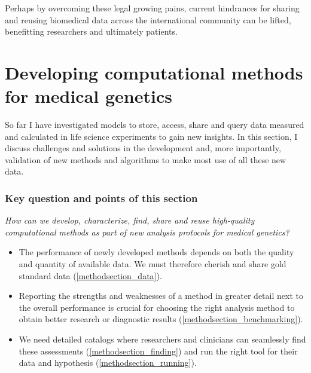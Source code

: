 Perhaps by overcoming these legal growing pains, current hindrances for sharing and reusing biomedical data across the international community can be lifted, benefitting researchers and ultimately patients.


\section{Developing computational methods for medical genetics} \label{methodsection}

So far I have investigated models to store, access, share and query data measured and calculated in life science experiments to gain new insights.
In this section, I discuss challenges and solutions in the development and, more importantly, validation of new methods and algorithms to make most use of all these new data.

\subsubsection*{Key question and points of this section}

\textsl{How can we develop, characterize, find, share and reuse high-quality computational methods as part of new analysis protocols for medical genetics?}

\begin{tcolorbox}[width=\textwidth,colframe=deeporange,colback={white},title={Key points},colbacktitle=deeporange,coltitle=black,enhanced]
  \begin{itemize}
    \item The performance of newly developed methods depends on both the quality and quantity of available data. We must therefore cherish and share gold standard data (\ref{methodsection_data}).
    \item Reporting the strengths and weaknesses of a method in greater detail next to the overall performance is crucial for choosing the right analysis method to obtain better research or diagnostic results (\ref{methodsection_benchmarking}).
    \item We need detailed catalogs where researchers and clinicians can seamlessly find these assessments (\ref{methodsection_finding}) and run the right tool for their data and hypothesis (\ref{methodsection_running}).
  \end{itemize}
\end{tcolorbox}


